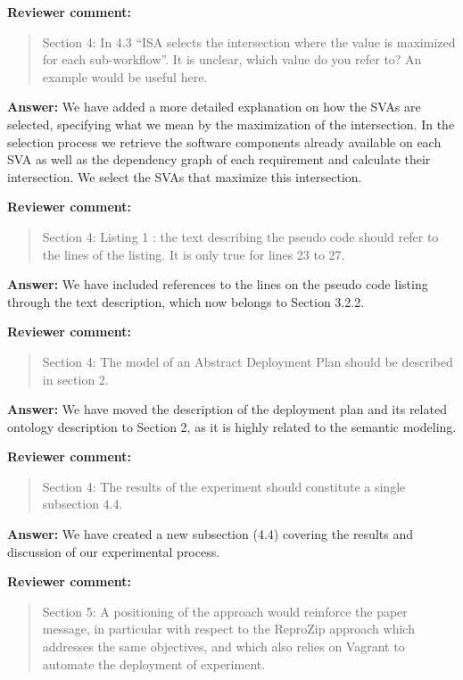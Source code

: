 \documentclass{letter}
\newenvironment{review}%
{\textbf{Reviewer comment:}\begin{quote}}%
{\end{quote}}%
\newcommand{\answer}[1]{%
      \textbf{Answer:} #1}
\begin{document}
\begin{letter}{}
\begin{review}
Section 4: In 4.3 ``ISA selects the intersection where the value is maximized for each sub-workflow''. It is unclear, which value do you refer to? An example would be useful here.
\end{review}

\answer{We have added a more detailed explanation on how the SVAs are selected, specifying what we mean by the maximization of the intersection. In the selection process we retrieve the software components already available on each SVA as well as the dependency graph of each requirement and calculate their intersection. We select the SVAs that maximize this intersection.}


\begin{review}
Section 4: Listing 1 : the text describing the pseudo code should refer to the lines of the listing. It is only true for lines 23 to 27.
\end{review}

\answer{We have included references to the lines on the pseudo code listing through the text description, which now belongs to Section 3.2.2.}


\begin{review}
Section 4: The model of an Abstract Deployment Plan should be described in section 2.
\end{review}

\answer{We have moved the description of the deployment plan and its related ontology description to Section 2, as it is highly related to the semantic modeling.}


\begin{review}
Section 4: The results of the experiment should constitute a single subsection 4.4.
\end{review}

\answer{We have created a new subsection (4.4) covering the results and discussion of our experimental process.}


\begin{review}
Section 5: A positioning of the approach would reinforce the paper message, in particular with respect to the ReproZip approach which addresses the same objectives, and which also relies on Vagrant to automate the deployment of experiment.
\end{review}


\end{letter}
\end{document}
